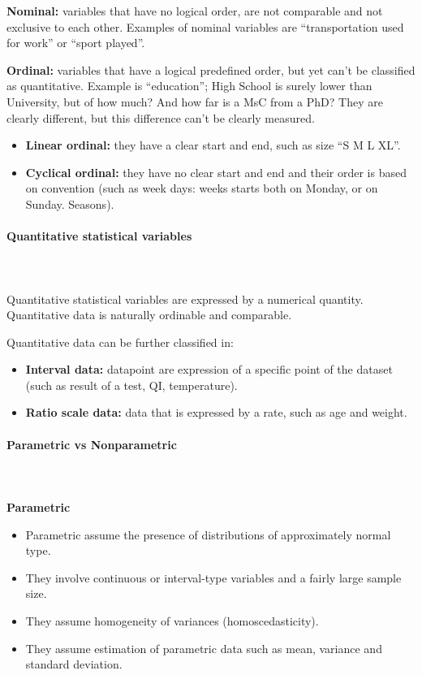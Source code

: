\documentclass{article}
\begin{document}
\textbf{Nominal:} variables that have no logical order, are not comparable and not exclusive to each other. Examples of nominal variables are “transportation used for work” or “sport played”.

\textbf{Ordinal:} variables that have a logical predefined order, but yet can’t be classified as quantitative. 
Example is “education”; High School is surely lower than University, but of how much? 
And how far is a MsC from a PhD? They are clearly different, but this difference can’t be clearly measured. 

    \begin{itemize}
        \item \textbf{Linear ordinal:} they have a clear start and end, such as size “S M L XL”.
        \item \textbf{Cyclical ordinal:} they have no clear start and end and their order is based on convention (such as week days: weeks starts both on Monday, or on Sunday. Seasons).
    \end{itemize}

\paragraph{Quantitative statistical variables}\mbox{} \\
\mbox{} \\

Quantitative statistical variables are expressed by a numerical quantity.
Quantitative data is naturally ordinable and comparable. 

Quantitative data can be further classified in: 

    \begin{itemize}
        \item \textbf{Interval data:} datapoint are expression of a specific point of the dataset (such as result of a test, QI, temperature).
        \item \textbf{Ratio scale data:} data that is expressed by a rate, such as age and weight.
    \end{itemize}

\paragraph{Parametric vs Nonparametric}\mbox{} \\
\mbox{} \\

\textbf{Parametric}
\begin{itemize}
    \item Parametric assume the presence of distributions of approximately normal type.
    \item They involve continuous or interval-type variables and a fairly large sample size.
    \item They assume homogeneity of variances (homoscedasticity).
    \item They assume estimation of parametric data such as mean, variance and standard deviation.
\end{itemize}
\end{document}
